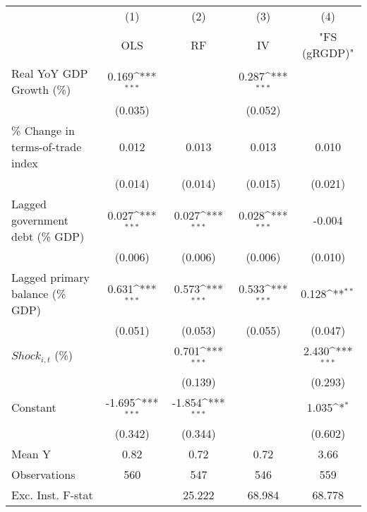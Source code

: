 {
\def\sym#1{\ifmmode^{#1}\else\(^{#1}\)\fi}
\begin{tabular}{l*{4}{c}}
\toprule
                    &\multicolumn{1}{c}{(1)}&\multicolumn{1}{c}{(2)}&\multicolumn{1}{c}{(3)}&\multicolumn{1}{c}{(4)}\\
                    &\multicolumn{1}{c}{OLS}&\multicolumn{1}{c}{RF}&\multicolumn{1}{c}{IV}&\multicolumn{1}{c}{ "FS (gRGDP)" }\\
\midrule
Real YoY GDP Growth (\%)&       0.169\sym{***}&                     &       0.287\sym{***}&                     \\
                    &     (0.035)         &                     &     (0.052)         &                     \\
\addlinespace
\% Change in terms-of-trade index&       0.012         &       0.013         &       0.013         &       0.010         \\
                    &     (0.014)         &     (0.014)         &     (0.015)         &     (0.021)         \\
\addlinespace
Lagged government debt (\% GDP)&       0.027\sym{***}&       0.027\sym{***}&       0.028\sym{***}&      -0.004         \\
                    &     (0.006)         &     (0.006)         &     (0.006)         &     (0.010)         \\
\addlinespace
Lagged primary balance (\% GDP)&       0.631\sym{***}&       0.573\sym{***}&       0.533\sym{***}&       0.128\sym{**} \\
                    &     (0.051)         &     (0.053)         &     (0.055)         &     (0.047)         \\
\addlinespace
$ Shock_{i,t}$ (\%) &                     &       0.701\sym{***}&                     &       2.430\sym{***}\\
                    &                     &     (0.139)         &                     &     (0.293)         \\
\addlinespace
Constant            &      -1.695\sym{***}&      -1.854\sym{***}&                     &       1.035\sym{*}  \\
                    &     (0.342)         &     (0.344)         &                     &     (0.602)         \\
\midrule
Mean Y              &        0.82         &        0.72         &        0.72         &        3.66         \\
Observations        &         560         &         547         &         546         &         559         \\
Exc. Inst. F-stat   &                     &      25.222         &      68.984         &      68.778         \\
\bottomrule
\end{tabular}
}
